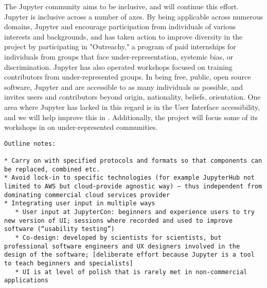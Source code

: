 The Jupyter community aims to be inclusive, and \TheProject will
continue this effort.  Jupyter is inclusive across a number of axes.
By being applicable across numerous domains, Jupyter and \TheProject
encourage participation from individuals of various interests and
backgrounds, and has taken action to improve diversity in the project
by participating in "Outreachy," a program of paid internships for
individuals from groups that face under-representation, systemic bias,
or discrimination.  Jupyter has also operated workshops focused on
training contributors from under-represented groups.  In being free,
public, open source software, Jupyter and \TheProject are accessible
to as many individuals as possible, and invites users and contributors
beyond origin, nationality, beliefs, orientation.  One area where
Jupyter has lacked in this regard is in the User Interface
accessibility, and we will help improve this in
.  Additionally, the project will
focus some of its workshops in  on
under-represented communities.




\begin{verbatim}
Outline notes:

* Carry on with specified protocols and formats so that components can be replaced, combined etc.
* Avoid lock-in to specific technologies (for example JupyterHub not limited to AWS but cloud-provide agnostic way) – thus independent from dominating commercial cloud services provider
* Integrating user input in multiple ways
   * User input at JupyterCon: beginners and experience users to try new version of UI; sessions where recorded and used to improve software (“usability testing”)
   * Co-design: developed by scientists for scientists, but professional software engineers and UX designers involved in the design of the software; [deliberate effort because Jupyter is a tool to teach beginners and specialists]
   * UI is at level of polish that is rarely met in non-commercial applications
\end{verbatim}
